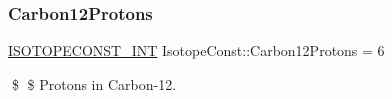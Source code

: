\subsubsection{\texorpdfstring{Carbon12\+Protons}{Carbon12Protons}}
{\footnotesize\ttfamily \mbox{\hyperlink{group___isotope_const-_macros_ga5f18360b3e99483a35c32d789e62621c}{I\+S\+O\+T\+O\+P\+E\+C\+O\+N\+S\+T\+\_\+\+I\+NT}} Isotope\+Const\+::\+Carbon12\+Protons = 6}

\$ \$ Protons in Carbon-\/12. 